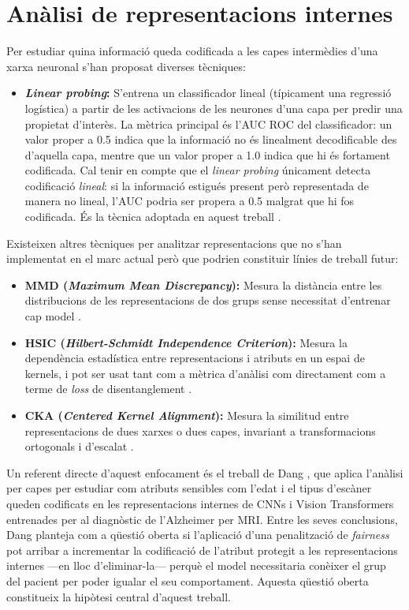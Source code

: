\documentclass[a4paper,12pt,twoside]{ThesisStyle}
\begin{document}
\section{Anàlisi de representacions internes}

Per estudiar quina informació queda codificada a les capes intermèdies d'una xarxa neuronal s'han proposat diverses tècniques:

\begin{itemize}
    \item \textbf{\textit{Linear probing}:} S'entrena un classificador lineal (típicament una regressió logística) a partir de les activacions de les neurones d'una capa per predir una propietat d'interès. La mètrica principal és l'AUC ROC del classificador: un valor proper a 0.5 indica que la informació no és linealment decodificable des d'aquella capa, mentre que un valor proper a 1.0 indica que hi és fortament codificada. Cal tenir en compte que el \textit{linear probing} únicament detecta codificació \textit{lineal}: si la informació estigués present però representada de manera no lineal, l'AUC podria ser propera a 0.5 malgrat que hi fos codificada. És la tècnica adoptada en aquest treball \cite{Alain2016}.
\end{itemize}

Existeixen altres tècniques per analitzar representacions que no s'han implementat en el marc actual però que podrien constituir línies de treball futur:

\begin{itemize}
    \item \textbf{MMD (\textit{Maximum Mean Discrepancy}):} Mesura la distància entre les distribucions de les representacions de dos grups sense necessitat d'entrenar cap model \cite{Gretton2012}.
    \item \textbf{HSIC (\textit{Hilbert-Schmidt Independence Criterion}):} Mesura la dependència estadística entre representacions i atributs en un espai de kernels, i pot ser usat tant com a mètrica d'anàlisi com directament com a terme de \textit{loss} de disentanglement \cite{Gretton2005}.
    \item \textbf{CKA (\textit{Centered Kernel Alignment}):} Mesura la similitud entre representacions de dues xarxes o dues capes, invariant a transformacions ortogonals i d'escalat \cite{Kornblith2019}.
\end{itemize}

Un referent directe d'aquest enfocament és el treball de Dang \cite{dang2026}, que aplica l'anàlisi per capes per estudiar com atributs sensibles com l'edat i el tipus d'escàner queden codificats en les representacions internes de CNNs i Vision Transformers entrenades per al diagnòstic de l'Alzheimer per MRI. Entre les seves conclusions, Dang planteja com a qüestió oberta si l'aplicació d'una penalització de \textit{fairness} pot arribar a incrementar la codificació de l'atribut protegit a les representacions internes ---en lloc d'eliminar-la--- perquè el model necessitaria conèixer el grup del pacient per poder igualar el seu comportament. Aquesta qüestió oberta constitueix la hipòtesi central d'aquest treball.
\end{document}
